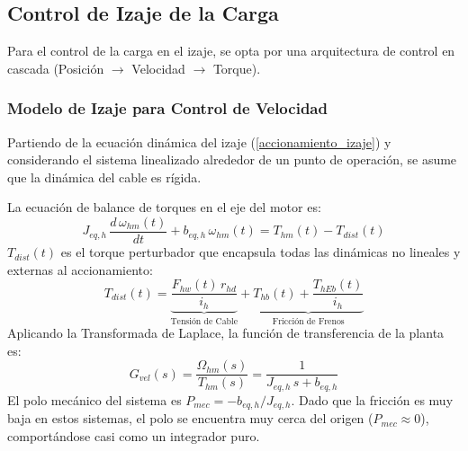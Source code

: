 \documentclass[11pt]{article}                                    %
\begin{document}
\subsection{Control de Izaje de la Carga}
Para el control de la carga en el izaje, se opta por una arquitectura de control en cascada (Posición $\to$ Velocidad $\to$ Torque).

\subsubsection{Modelo de Izaje para Control de Velocidad}
Partiendo de la ecuación dinámica del izaje (\ref{accionamiento_izaje}) y considerando el sistema linealizado alrededor de un punto de operación, se asume que la dinámica del cable es rígida. 

La ecuación de balance de torques en el eje del motor es:
\begin{equation}
    J_{eq,h} \, \frac{d \, \omega_{hm}(t)}{dt} + b_{eq,h} \, \omega_{hm}(t) = T_{hm}(t) - T_{dist}(t)
\end{equation}
$T_{dist}(t)$ es el torque perturbador que encapsula todas las dinámicas no lineales y externas al accionamiento:
\begin{equation}
    T_{dist}(t) = \underbrace{\frac{F_{hw}(t) \, r_{hd}}{i_h}}_{\text{Tensión de Cable}} + \underbrace{T_{hb}(t) + \frac{T_{hEb}(t)}{i_h}}_{\text{Fricción de Frenos}}
\end{equation}
Aplicando la Transformada de Laplace, la función de transferencia de la planta es:
\begin{equation} \label{eq:G_vel}
    G_{vel}(s) = \frac{\Omega_{hm}(s)}{T_{hm}(s)} = \frac{1}{J_{eq,h} \, s + b_{eq,h}}
\end{equation}
El polo mecánico del sistema es $P_{mec} = -b_{eq,h}/J_{eq,h}$. Dado que la fricción es muy baja en estos sistemas, el polo se encuentra muy cerca del origen ($P_{mec} \approx 0$), comportándose casi como un integrador puro.
\end{document}

